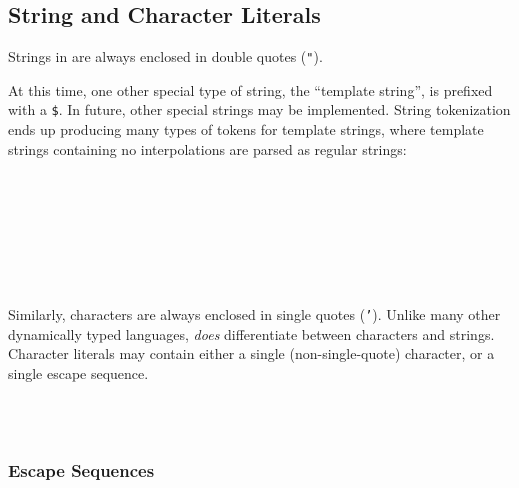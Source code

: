\subsection{String and Character Literals}

Strings in \Trilogy{} are always enclosed in double quotes (\texttt{"}).

At this time, one other special type of string, the ``template string'',
is prefixed with a \texttt{\$}. In future, other special strings may be %
implemented. String tokenization ends up producing many types of tokens
for template strings, where template strings containing no interpolations
are parsed as regular strings:

\begin{bnf*}
     \\
    \\
     \\
     \\
     \\
     \\
\end{bnf*}

Similarly, characters are always enclosed in single quotes (\texttt{'}).
Unlike many other dynamically typed languages, \Trilogy{} \emph{does} differentiate
between characters and strings. Character literals may contain either a
single (non-single-quote) character, or a single escape sequence.

\begin{bnf*}
     \\
     \\
\end{bnf*}

\subsubsection{Escape Sequences}
\label{sec:escapesequences}
\FloatBarrier

